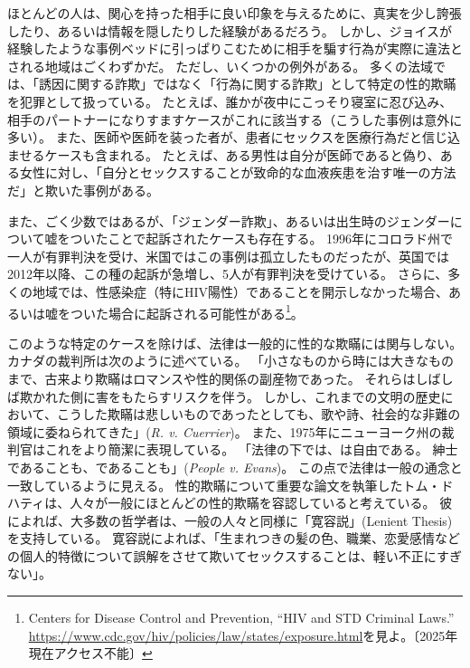 \documentclass[paper=a4,book,openany]{jlreq} \usepackage{mystyle}
\begin{document}
ほとんどの人は、関心を持った相手に良い印象を与えるために、真実を少し誇張したり、あるいは情報を隠したりした経験があるだろう。
しかし、ジョイスが経験したような事例{\DDASH}ベッドに引っぱりこむために相手を騙す行為{\DDASH}が実際に違法とされる地域はごくわずかだ。
ただし、いくつかの例外がある。
多くの法域では、「誘因に関する詐欺」ではなく「行為に関する詐欺」として特定の性的欺瞞を犯罪として扱っている。
たとえば、誰かが夜中にこっそり寝室に忍び込み、相手のパートナーになりすますケースがこれに該当する（こうした事例は意外に多い）。
また、医師や医師を装った者が、患者にセックスを医療行為だと信じ込ませるケースも含まれる。
たとえば、ある男性は自分が医師であると偽り、ある女性に対し、「自分とセックスすることが致命的な血液疾患を治す唯一の方法だ」と欺いた事例がある\citep{chavez87:_woman_says_ruse_trick_her_sex}。

また、ごく少数ではあるが、「ジェンダー詐欺」、あるいは出生時のジェンダーについて嘘をついたことで起訴されたケースも存在する。
1996年にコロラド州で一人が有罪判決を受け、米国ではこの事例は孤立したものだったが、英国では2012年以降、この種の起訴が急増し、5人が有罪判決を受けている\citep{wilkinson17:_troub_case_uk_woman_convic_gender_fraud}。
さらに、多くの地域では、性感染症（特にHIV陽性）であることを開示しなかった場合、あるいは嘘をついた場合に起訴される可能性がある\footnote{Centers for Disease Control and Prevention, ``HIV and STD Criminal Laws.'' \url{https://www.cdc.gov/hiv/policies/law/states/exposure.html}を見よ。〔2025年現在アクセス不能〕}。

このような特定のケースを除けば、法律は一般的に性的な欺瞞には関与しない。
カナダの裁判所は次のように述べている。
「小さなものから時には大きなものまで、古来より欺瞞はロマンスや性的関係の副産物であった。
それらはしばしば欺かれた側に害をもたらすリスクを伴う。
しかし、これまでの文明の歴史において、こうした欺瞞は悲しいものであったとしても、歌や詩、社会的な非難の領域に委ねられてきた」(\emph{R. v. Cuerrier})。
また、1975年にニューヨーク州の裁判官はこれをより簡潔に表現している。
「法律の下では、は自由である。
紳士であることも、であることも」(\emph{People v. Evans})。
この点で法律は一般の通念と一致しているように見える。
性的欺瞞について重要な論文を執筆したトム・ドハティは、人々が一般にほとんどの性的欺瞞を容認していると考えている。
彼によれば、大多数の哲学者は、一般の人々と同様に「寛容説」(Lenient Thesis)を支持している。
寛容説によれば、「生まれつきの髪の色、職業、恋愛感情などの個人的特徴について誤解をさせて欺いてセックスすることは、軽い不正にすぎない」\citep[p.718]{dougherty13:_sex_lies_consen}。
\end{document}
